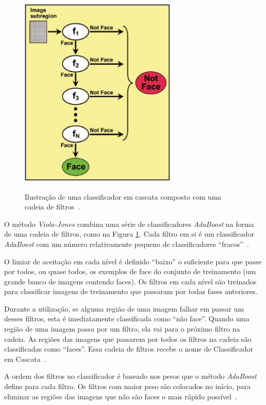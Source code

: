 	\begin{figure}[htb]
		\begin{center}
			\includegraphics[height=10cm,width=7.5cm]{figuras/2.FundamentacaoTeorica/filterchain.png}
		\end{center}
		\caption{Ilustração de uma classificador em cascata composto com uma cadeia de filtros~\cite{servodetection}.}
		\label{filterchain}
	\end{figure}

O método \textit{Viola-Jones} combina uma série de classificadores \textit{AdaBoost} na forma de uma cadeia de filtros, como na Figura \ref{filterchain}. Cada filtro em si é um classificador \textit{AdaBoost} com um número relativamente pequeno de classificadores ``fracos''~\cite{servodetection}. 

O limiar de aceitação em cada nível é definido ``baixo'' o suficiente para que passe por todos, ou quase todos, os exemplos de face do conjunto de treinamento (um grande banco de imagens contendo faces). Os filtros em cada nível são treinados para classificar imagens de treinamento que passaram por todas fases anteriores.

Durante a utilização, se alguma região de uma imagem falhar em passar um desses filtros, esta é imediatamente classificada como ``não face''. Quando uma região de uma imagem passa por um filtro, ela vai para o próximo filtro na cadeia. As regiões das imagens que passarem por todos os filtros na cadeia são classificadas como ``faces''. Essa cadeia de filtros recebe o nome de Classificador em Cascata~\cite{servodetection}.

A ordem dos filtros no classificador é baseado nos pesos que o método \textit{AdaBoost} define para cada filtro. Os filtros com maior peso são colocados no início, para eliminar as regiões das imagens que não são faces o mais rápido possível~\cite{servodetection}.

